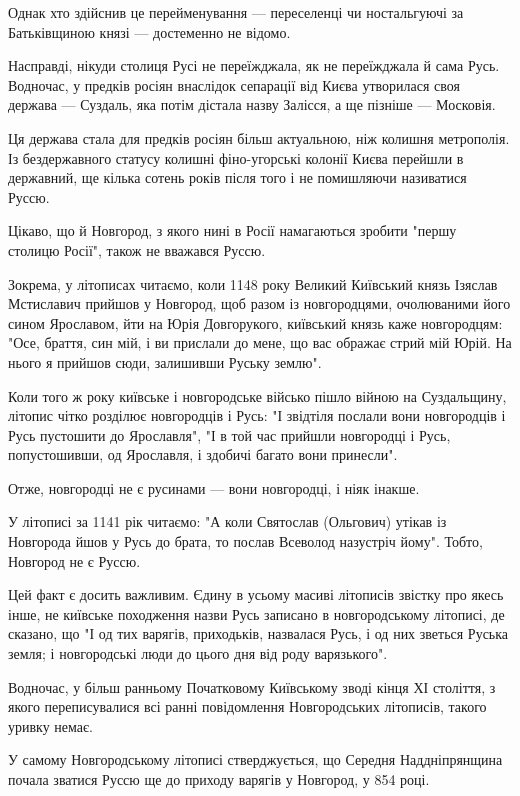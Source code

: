 Однак хто здійснив це перейменування --- переселенці чи ностальгуючі за
Батьківщиною князі --- достеменно не відомо.

Насправді, нікуди столиця Русі не переїжджала, як не переїжджала й сама Русь.
Водночас, у предків росіян внаслідок сепарації від Києва утворилася своя
держава --- Суздаль, яка потім дістала назву Залісся, а ще пізніше --- Московія.

Ця держава стала для предків росіян більш актуальною, ніж колишня метрополія.
Із бездержавного статусу колишні фіно-угорські колонії Києва перейшли в
державний, ще кілька сотень років після того і не помишляючи називатися Руссю.

Цікаво, що й Новгород, з якого нині в Росії намагаються зробити "першу столицю
Росії", також не вважався Руссю.

Зокрема, у літописах читаємо, коли 1148 року Великий Київський князь Ізяслав
Мстиславич прийшов у Новгород, щоб разом із новгородцями, очолюваними його
сином Ярославом, йти на Юрія Довгорукого, київський князь каже новгородцям:
"Осе, браття, син мій, і ви прислали до мене, що вас ображає стрий мій Юрій. На
нього я прийшов сюди, залишивши Руську землю".

Коли того ж року київське і новгородське військо пішло війною на Суздальщину,
літопис чітко розділює новгородців і Русь: "І звідтіля послали вони новгородців
і Русь пустошити до Ярославля", "І в той час прийшли новгородці і Русь,
попустошивши, од Ярославля, і здобичі багато вони принесли".

Отже, новгородці не є русинами --- вони новгородці, і ніяк інакше.

У літописі за 1141 рік читаємо: "А коли Святослав (Ольгович) утікав із
Новгорода йшов у Русь до брата, то послав Всеволод назустріч йому". Тобто,
Новгород не є Руссю.

Цей факт є досить важливим. Єдину в усьому масиві літописів звістку про якесь
інше, не київське походження назви Русь записано в новгородському літописі, де
сказано, що "І од тих варягів, приходьків, назвалася Русь, і од них зветься
Руська земля; і новгородські люди до цього дня від роду варязького".

Водночас, у більш ранньому Початковому Київському зводі кінця ХІ століття, з
якого переписувалися всі ранні повідомлення Новгородських літописів, такого
уривку немає.

У самому Новгородському літописі стверджується, що Середня Наддніпрянщина
почала зватися Руссю ще до приходу варягів у Новгород, у 854 році.

